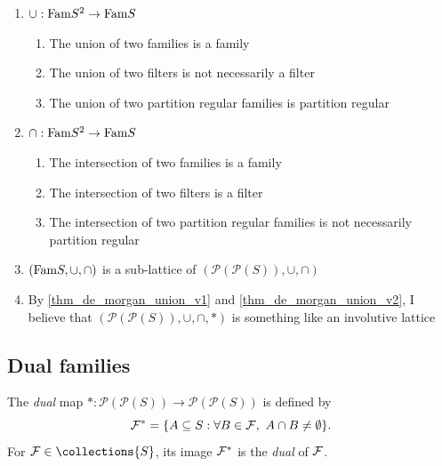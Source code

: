 \begin{enumerate}
    \item $\cup: \text{Fam}{S}^2 \to \text{Fam}{S}$
    \begin{enumerate}
        \item The union of two families is a family
        \item The union of two filters is not necessarily a filter
        \item The union of two partition regular families is partition regular
    \end{enumerate}
    \item $\cap : \text{Fam}{S}^2 \to \text{Fam}{S}$
        \begin{enumerate}
        \item The intersection of two families is a family
        \item The intersection of two filters is a filter
        \item The intersection of two partition regular families is not necessarily partition regular
    \end{enumerate}
    \item $(\text{Fam}{S}, \cup, \cap)$ is a sub-lattice of $(\mathcal{P}(\mathcal{P}(S)),\cup,\cap)$
    \item By \cref{thm_de_morgan_union_v1} and \cref{thm_de_morgan_union_v2}, I believe that $(\mathcal{P}(\mathcal{P}(S)),\cup,\cap,*)$ is something like an involutive lattice
\end{enumerate}

\subsection{Dual families}

\begin{definition}
    The \emph{dual} map $*: \mathcal{P}(\mathcal{P}(S)) \to \mathcal{P}(\mathcal{P}(S))$ is defined by 
    \[\mathcal{F}^* = \{A \subseteq S : \forall B \in \mathcal{F}, \ A \cap B \neq \emptyset\}.\]
    For $\family \in \collections{S}$, its image $\mathcal{F}^*$ is the \emph{dual} of $\mathcal{F}$.
\end{definition}

\vskip0.5cm

